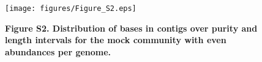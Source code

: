 \clearpage
\thispagestyle{empty}
\begin{figure}
\centering
\texttt{[image: figures/Figure\_S2.eps]}
\caption{
{\bf Figure S2. Distribution of bases in contigs over purity and length
intervals for the mock community with even abundances per genome.}}
\label{Figure_S2}
\end{figure}


